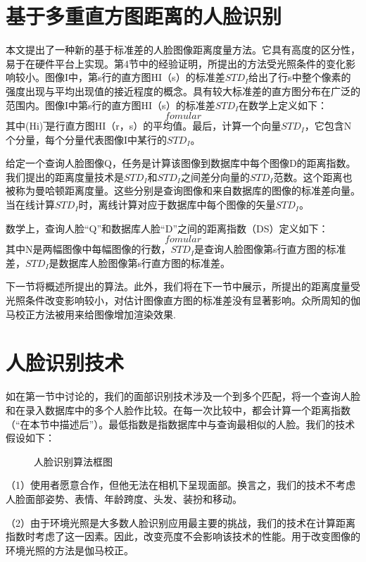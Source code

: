 \section{基于多重直方图距离的人脸识别}
本文提出了一种新的基于标准差的人脸图像距离度量方法。它具有高度的区分性，易于在硬件平台上实现。第4节中的经验证明，所提出的方法受光照条件的变化影响较小。图像I中，第s行的直方图HI（s）的标准差$STD_I$给出了行s中整个像素的强度出现与平均出现值的接近程度的概念。具有较大标准差的直方图分布在广泛的范围内。图像I中第s行的直方图HI（s）的标准差$STD_I$在数学上定义如下：
\begin{equation}
	fomular
\end{equation}
其中(Hi) ̅是行直方图HI（r，s）的平均值。最后，计算一个向量$STD_I$，它包含N个分量，每个分量代表图像I中某行的$STD_I$。

给定一个查询人脸图像Q，任务是计算该图像到数据库中每个图像D的距离指数。我们提出的距离度量技术是$STD_I$和$STD_I$之间差分向量的$STD_I$范数。这个距离也被称为曼哈顿距离度量。这些分别是查询图像和来自数据库的图像的标准差向量。当在线计算$STD_I$时，离线计算对应于数据库中每个图像的矢量$STD_I$。

数学上，查询人脸“Q”和数据库人脸“D”之间的距离指数（DS）定义如下：
\begin{equation}
	fomular
\end{equation}
其中N是两幅图像中每幅图像的行数，$STD_I$是查询人脸图像第s行直方图的标准差，$STD_I$是数据库人脸图像第s行直方图的标准差。

下一节将概述所提出的算法。此外，我们将在下一节中展示，所提出的距离度量受光照条件改变影响较小，对估计图像直方图的标准差没有显著影响。众所周知的伽马校正方法被用来给图像增加渲染效果.
\section{人脸识别技术}
如在第一节中讨论的，我们的面部识别技术涉及一个到多个匹配，将一个查询人脸和在录入数据库中的多个人脸作比较。在每一次比较中，都会计算一个距离指数（“在本节中描述后”）。最低指数是指数据库中与查询最相似的人脸。我们的技术假设如下：
\begin{figure}
	\centering
	\caption{\song\wuhao 人脸识别算法框图}

\end{figure}
（1）使用者愿意合作，但他无法在相机下呈现面部。换言之，我们的技术不考虑人脸面部姿势、表情、年龄跨度、头发、装扮和移动。

（2）由于环境光照是大多数人脸识别应用最主要的挑战，我们的技术在计算距离指数时考虑了这一因素。因此，改变亮度不会影响该技术的性能。用于改变图像的环境光照的方法是伽马校正。

